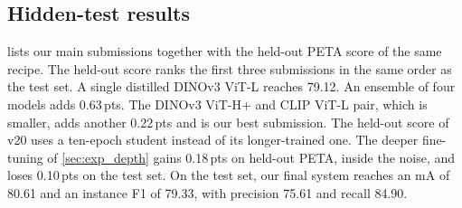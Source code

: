 \documentclass[10pt,twocolumn,letterpaper]{article}
\newcommand{\pts}{\,pts}
\begin{document}
\begin{table}[t]
\centering\small
\setlength{\tabcolsep}{3.2pt}
\caption{Conservative fine-tuning $\rightarrow$ deeper fine-tuning.}
\label{tab:depth}
\end{table}

\subsection{Hidden-test results}
\label{sec:exp_test}

 lists our main submissions together with the held-out PETA score of the same recipe. The held-out score ranks the first three submissions in the same order as the test set. A single distilled DINOv3 ViT-L reaches 79.12. An ensemble of four models adds 0.63\pts. The DINOv3 ViT-H+ and CLIP ViT-L pair, which is smaller, adds another 0.22\pts{} and is our best submission. The held-out score of v20 uses a ten-epoch student instead of its longer-trained one. The deeper fine-tuning of \cref{sec:exp_depth} gains 0.18\pts{} on held-out PETA, inside the noise, and loses 0.10\pts{} on the test set. On the test set, our final system reaches an mA of 80.61 and an instance F1 of 79.33, with precision 75.61 and recall 84.90.

\begin{table}[t]
\centering\small
\setlength{\tabcolsep}{3pt}
\caption{Our main submissions to UPAR 2027 Track~1.}
\label{tab:test}
\end{table}
\end{document}
